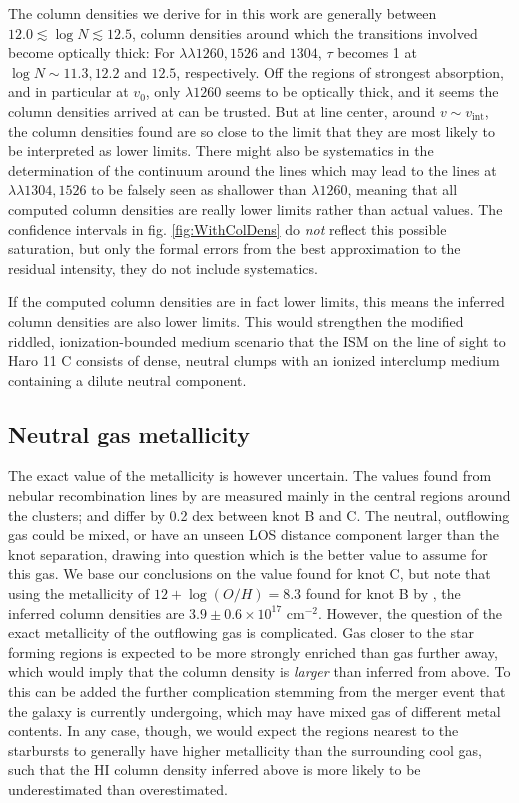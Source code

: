 \documentclass[twocolumn,]{aastex61}
\begin{document}
The column densities we derive for  in this work are
generally between $12.0 \lesssim \log N \lesssim 12.5$, column densities
around which the transitions involved become optically thick: For
$\lambda \lambda 1260, 1526 \text{ and } 1304$, $\tau$ becomes 1 at
$\log N \sim 11.3, 12.2$ and $12.5$, respectively. Off the regions of
strongest absorption, and in particular at $v_0$, only $\lambda 1260$
seems to be optically thick, and it seems the column densities arrived
at can be trusted. But at line center, around $v\sim v_{\mathrm{int}}$, the
column densities found are so close to the limit that they are most
likely to be interpreted as lower limits. There might also be
systematics in the determination of the continuum around the lines which
may lead to the lines at $\lambda \lambda 1304, 1526$ to be falsely seen
as shallower than $\lambda 1260$, meaning that all computed column
densities are really lower limits rather than actual values. The
confidence intervals in fig. \ref{fig:WithColDens} do \emph{not} reflect
this possible saturation, but only the formal errors from the best
approximation to the residual intensity, they do not include
systematics.

If the computed column densities are in fact lower limits, this means
the inferred  column densities are also lower limits. This
would strengthen the modified riddled, ionization-bounded medium
scenario that the ISM on the line of sight to Haro 11 C consists of
dense, neutral clumps with an ionized interclump medium containing a
dilute neutral component.

\subsection{Neutral gas metallicity}\label{neutral-gas-metallicity}

The exact value of the metallicity is however uncertain. The values
found from nebular recombination lines by \citet{Guseva2012} are
measured mainly in the central  regions around the clusters;
and differ by 0.2 dex between knot B and C. The neutral, outflowing gas
could be mixed, or have an unseen LOS distance component larger than the
knot separation, drawing into question which is the better value to
assume for this gas. We base our conclusions on the value found for knot
C, but note that using the metallicity of $12 + \log (O/H) = 8.3$ found
for knot B by \citet{Guseva2012}, the inferred  column
densities are $3.9 \pm 0.6 \times 10^{17}$ cm$^{-2}$.
However, the question of the exact metallicity of the outflowing gas is
complicated. Gas closer to the star forming regions is expected to be
more strongly enriched than gas further away, which would imply that the
 column density is \emph{larger} than inferred from
 above. To this can be added the further complication
stemming from the merger event that the galaxy is currently undergoing,
which may have mixed gas of different metal contents. In any case,
though, we would expect the regions nearest to the starbursts to
generally have higher metallicity than the surrounding cool gas, such
that the HI column density inferred above is more likely to be
underestimated than overestimated.
\end{document}
